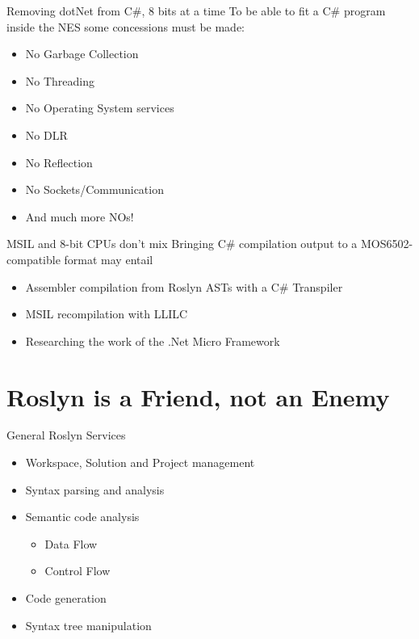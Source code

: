 \documentclass[10pt]{beamer}
\begin{document}
\begin{frame}{Removing dotNet from C\#, 8 bits at a time}
To be able to fit a C\# program inside the NES some concessions must be made:
\begin{itemize}
	\item No Garbage Collection
	\item No Threading
	\item No Operating System services
	\item No DLR
	\item No Reflection
	\item No Sockets/Communication
	\item And much more NOs!
\end{itemize}
\end{frame}

\begin{frame}{MSIL and 8-bit CPUs don't mix}
Bringing C\# compilation output to a MOS6502-compatible format may entail
\begin{itemize}
	\item Assembler compilation from Roslyn ASTs with a C\# Transpiler
	\item MSIL recompilation with LLILC
	\item Researching the work of the .Net Micro Framework
\end{itemize}
\end{frame}

\section{Roslyn is a Friend, not an Enemy}
\begin{frame}{General Roslyn Services}
\begin{itemize}
    \item Workspace, Solution and Project management
    \item Syntax parsing and analysis
    \item Semantic code analysis
        \begin{itemize}
            \item Data Flow
            \item Control Flow
        \end{itemize}
    \item Code generation
    \item Syntax tree manipulation
\end{itemize}
\end{frame}
\end{document}
